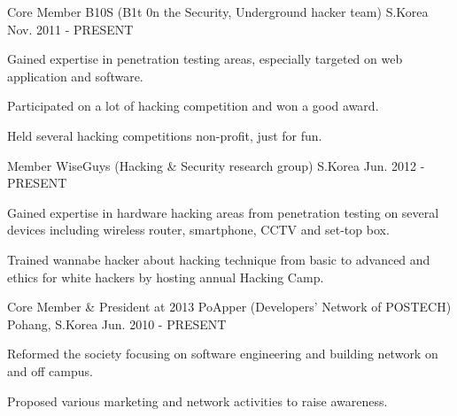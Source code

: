 
\begin{cventries}

  \cventry
  {Core Member} %
  {B10S (B1t 0n the Security, Underground hacker team)} %
  {S.Korea} %
  {Nov. 2011 - PRESENT} %
  {
    \begin{cvitems} %
    \item {Gained expertise in penetration testing areas, especially targeted on web application and software.}
    \item {Participated on a lot of hacking competition and won a good award.}
    \item {Held several hacking competitions non-profit, just for fun.}
    \end{cvitems}
  }

  \cventry
  {Member} %
  {WiseGuys (Hacking \& Security research group)} %
  {S.Korea} %
  {Jun. 2012 - PRESENT} %
  {
    \begin{cvitems} %
    \item {Gained expertise in hardware hacking areas from penetration testing on several devices including wireless router, smartphone, CCTV and set-top box.}
    \item {Trained wannabe hacker about hacking technique from basic to advanced and ethics for white hackers by hosting annual Hacking Camp.}
    \end{cvitems}
  }

  \cventry
  {Core Member \& President at 2013} %
  {PoApper (Developers' Network of POSTECH)} %
  {Pohang, S.Korea} %
  {Jun. 2010 - PRESENT} %
  {
    \begin{cvitems} %
    \item {Reformed the society focusing on software engineering and building network on and off campus.}
    \item {Proposed various marketing and network activities to raise awareness.}
    \end{cvitems}
  }


\end{cventries}
